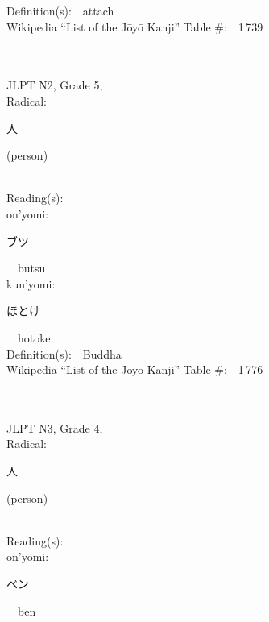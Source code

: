 \begin{multicols}{2}
Definition(s):\ \ attach \\
Wikipedia ``List of the J\=oy\=o Kanji'' Table \#:\ \ 1\,739 \\
\ \ \\
{\fontsize{34pt}{40pt}  }\ \ \\  %
{JLPT N2, Grade 5, \\Radical:\ \ {\begin{CJK}{UTF8}{min} 人 \end{CJK}} (person) } \\
Reading(s):\ \ \\
{\hspace*{1em}}on'yomi:\ \ \\
{\hspace*{2em}}{\begin{CJK}{UTF8}{min} ブツ \end{CJK}}\ \ butsu\ \ \\
{\hspace*{1em}}kun'yomi:\ \ \\
{\hspace*{2em}}{\begin{CJK}{UTF8}{min} ほとけ \end{CJK}}\ \ hotoke\ \ \\
Definition(s):\ \ Buddha \\
Wikipedia ``List of the J\=oy\=o Kanji'' Table \#:\ \ 1\,776 \\
\ \ \\
{\fontsize{34pt}{40pt}  }\ \ \\  %
{JLPT N3, Grade 4, \\Radical:\ \ {\begin{CJK}{UTF8}{min} 人 \end{CJK}} (person) } \\
Reading(s):\ \ \\
{\hspace*{1em}}on'yomi:\ \ \\
{\hspace*{2em}}{\begin{CJK}{UTF8}{min} ベン \end{CJK}}\ \ ben\ \ \\

\end{multicols}
